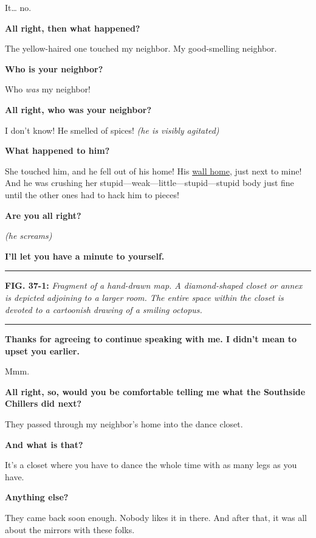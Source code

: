 \documentclass[smalldemyvopaper,11pt,twoside,onecolumn,openright,extrafontsizes]{memoir}
\begin{document}
It\ldots{} no.

\textbf{All right, then what happened?}

The yellow-haired one touched my neighbor. My good-smelling neighbor.

\textbf{Who is your neighbor?}

Who \emph{was} my neighbor!

\textbf{All right, who was your neighbor?}

I don't know! He smelled of spices! \emph{(he is visibly agitated)}

\textbf{What happened to him?}

She touched him, and he fell out of his home! His
\href{https://imgur.com/gallery/nUoaFR0}{wall home}, just next to mine!
And he was crushing her stupid---weak---little---stupid---stupid body
just fine until the other ones had to hack him to pieces!

\textbf{Are you all right?}

\emph{(he screams)}

\textbf{I'll let you have a minute to yourself.}

\begin{center}\rule{0.5\linewidth}{\linethickness}\end{center}

\textbf{FIG. 37-1:} \emph{Fragment of a hand-drawn map. A diamond-shaped
closet or annex is depicted adjoining to a larger room. The entire space
within the closet is devoted to a cartoonish drawing of a smiling
octopus.}

\begin{center}\rule{0.5\linewidth}{\linethickness}\end{center}

\textbf{Thanks for agreeing to continue speaking with me. I didn't mean
to upset you earlier.}

Mmm.

\textbf{All right, so, would you be comfortable telling me what the
Southside Chillers did next?}

They passed through my neighbor's home into the dance closet.

\textbf{And what is that?}

It's a closet where you have to dance the whole time with as many legs
as you have.

\textbf{Anything else?}

They came back soon enough. Nobody likes it in there. And after that, it
was all about the mirrors with these folks.
\end{document}
